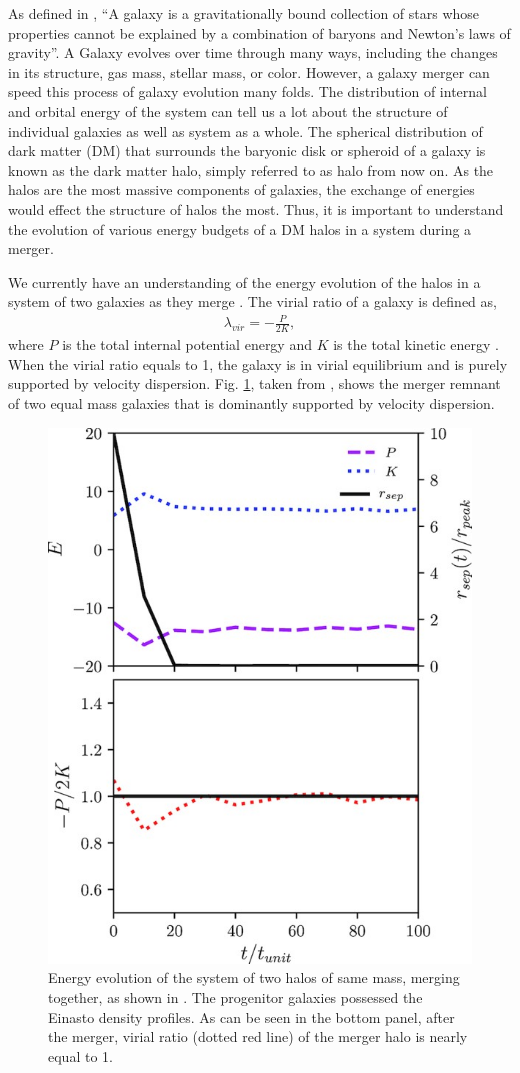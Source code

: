 \documentclass[twocolumn]{aastex631}
\begin{document}
As defined in \cite{galaxy_def}, ``A galaxy is a gravitationally bound collection of stars whose properties cannot be explained by a combination of baryons and Newton’s laws of gravity''. A Galaxy evolves over time through many ways, including the changes in its structure, gas mass, stellar mass, or color. However, a galaxy merger can speed this process of galaxy evolution many folds. The distribution of internal and orbital energy of the system can tell us a lot about the structure of individual galaxies as well as system as a whole. The spherical distribution of dark matter (DM) that surrounds the baryonic disk or spheroid of a galaxy is known as the dark matter halo, simply referred to as halo from now on. As the halos are the most massive components of galaxies, the exchange of energies would effect the structure of halos the most. Thus, it is important to understand the evolution of various energy budgets of a DM halos in a system during a merger. 

We currently have an understanding of the energy evolution of the halos in a system of two galaxies as they merge \citep[e.g.][]{same_mass_merger_1, same_mass_merger_2}. The virial ratio of a galaxy is defined as, 
\begin{align}
    \lambda_{vir} = - \frac{P}{2K},
    \label{eq:virial_ratio}
\end{align}
where $P$ is the total internal potential energy and $K$ is the total kinetic energy \citep{same_mass_merger_1}. When the virial ratio equals to 1, the galaxy is in virial equilibrium and is purely supported by velocity dispersion. Fig. \ref{fig:virial}, taken from \cite{same_mass_merger_1}, shows the merger remnant of two equal mass galaxies that is dominantly supported by velocity dispersion.

\begin{figure}[htbp]
\includegraphics[width=.5\textwidth]{two_galaxy_merger.jpg}
\caption{Energy evolution of the system of two halos of same mass, merging together, as shown in \cite{same_mass_merger_1}. The progenitor galaxies possessed the Einasto density profiles. As can be seen in the bottom panel, after the merger, virial ratio (dotted red line) of the merger halo is nearly equal to 1.\label{fig:virial}}
\end{figure}
\end{document}
